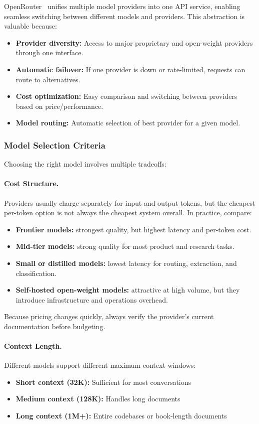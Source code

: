\documentclass[class=article,crop=false]{standalone}
\begin{document}
OpenRouter~\cite{openrouter} unifies multiple model providers into one API service, enabling seamless switching between different models and providers. This abstraction is valuable because:
\begin{itemize}
  \item \textbf{Provider diversity:} Access to major proprietary and open-weight providers through one interface.
  \item \textbf{Automatic failover:} If one provider is down or rate-limited, requests can route to alternatives.
  \item \textbf{Cost optimization:} Easy comparison and switching between providers based on price/performance.
  \item \textbf{Model routing:} Automatic selection of best provider for a given model.
\end{itemize}

\subsubsection{Model Selection Criteria}

Choosing the right model involves multiple tradeoffs:

\paragraph{Cost Structure.} Providers usually charge separately for input and output tokens, but the cheapest per-token option is not always the cheapest system overall. In practice, compare:
\begin{itemize}
  \item \textbf{Frontier models:} strongest quality, but highest latency and per-token cost.
  \item \textbf{Mid-tier models:} strong quality for most product and research tasks.
  \item \textbf{Small or distilled models:} lowest latency for routing, extraction, and classification.
  \item \textbf{Self-hosted open-weight models:} attractive at high volume, but they introduce infrastructure and operations overhead.
\end{itemize}
Because pricing changes quickly, always verify the provider's current documentation before budgeting.

\paragraph{Context Length.} Different models support different maximum context windows:
\begin{itemize}
  \item \textbf{Short context (32K):} Sufficient for most conversations
  \item \textbf{Medium context (128K):} Handles long documents
  \item \textbf{Long context (1M+):} Entire codebases or book-length documents
\end{itemize}
\end{document}
